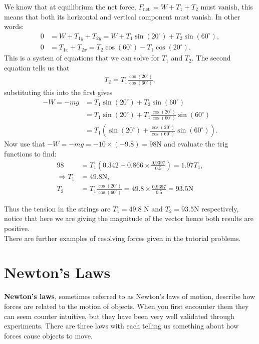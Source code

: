 We know that at equilibrium the net force, $F_{\text{net}~}=W+T_{1}+T_{2}$ must vanish, this means that both its horizontal and vertical component must vanish. In other words:
\begin{align}
0&=W+T_{1y}+T_{2y}=W +T_{1}\sin(20^{\circ})+T_{2}\sin(60^{\circ}) \label{eq: vertical force components},\\
0&=T_{1x}+T_{2x}= T_{2}\cos(60^{\circ}) -T_{1}\cos(20^{\circ}) \label{eq: horizontal force components}.
\end{align}
This is a system of equations that we can solve for $T_{1}$ and $T_{2}$. The second equation tells us that 
\begin{align*}
T_{2}=T_{1}\frac{\cos(20^{\circ})}{\cos(60^{\circ})},
\end{align*}
substituting this into the first gives
\begin{align*}
-W=-mg	&=T_{1}\sin(20^{\circ})+T_{2}\sin(60^{\circ})\\
		&=T_{1}\sin(20^{\circ})+T_{1}\frac{\cos(20^{\circ})}{\cos(60^{\circ})}\sin(60^{\circ})\\
		&=T_{1}\left(\sin(20^{\circ})+\frac{\cos(20^{\circ})}{\cos(60^{\circ})}\sin(60^{\circ})\right).
\end{align*}
Now use that $-W=-mg=-10\times (-9.8)=98\text{N}$ and evaluate the trig functions to find:
\begin{align*}
98&=T_{1}\left(0.342+0.866\times\frac{0.9397}{0.5}\right)=1.97T_{1},\\
\Rightarrow T_{1}&=49.8\text{N},\\
T_{2}&=T_{1}\frac{\cos(20^{\circ})}{\cos(60^{\circ})}=49.8\times \frac{0.9397}{0.5}=93.5\text{N}
\end{align*}

Thus the tension in the strings are $T_{1}=49.8$ N and $T_{2}=93.5$N respectively, notice that here we are giving the magnitude of the vector hence both results are positive.\\

There are further examples of resolving forces given in the tutorial problems.

\section{Newton's Laws}
\textbf{Newton's laws}, sometimes referred to as Newton's laws of motion, describe how forces are related to the motion of objects. When you first encounter them they can seem counter intuitive, but they have been very well validated through experiments. There are three laws with each telling us something about how forces cause objects to move.

